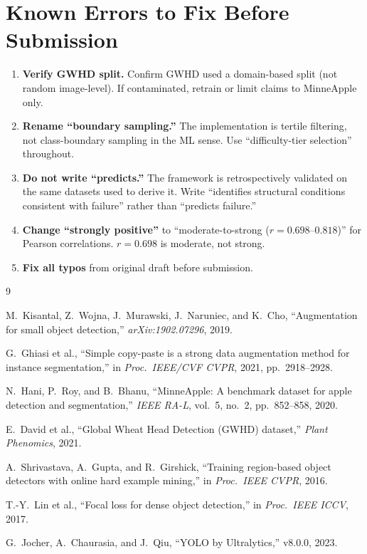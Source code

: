 \documentclass[10pt, a4paper]{article}
\begin{document}
\section{Known Errors to Fix Before Submission}

\begin{enumerate}[nosep, leftmargin=*]
\item \textbf{Verify GWHD split.}
  Confirm GWHD used a domain-based split (not random image-level).
  If contaminated, retrain or limit claims to MinneApple only.
\item \textbf{Rename ``boundary sampling.''} 
  The implementation is tertile filtering, not class-boundary sampling
  in the ML sense. Use ``difficulty-tier selection'' throughout.
\item \textbf{Do not write ``predicts.''}
  The framework is retrospectively validated on the same datasets
  used to derive it.
  Write ``identifies structural conditions consistent with failure''
  rather than ``predicts failure.''
\item \textbf{Change ``strongly positive''} to ``moderate-to-strong
  ($r=0.698$--$0.818$)'' for Pearson correlations.
  $r=0.698$ is moderate, not strong.
\item \textbf{Fix all typos} from original draft before submission.
\end{enumerate}

\begin{thebibliography}{9}

M.~Kisantal, Z.~Wojna, J.~Murawski, J.~Naruniec, and K.~Cho,
``Augmentation for small object detection,''
\textit{arXiv:1902.07296}, 2019.

G.~Ghiasi et al.,
``Simple copy-paste is a strong data augmentation method for instance
segmentation,''
in \textit{Proc.\ IEEE/CVF CVPR}, 2021, pp.\ 2918--2928.

N.~Hani, P.~Roy, and B.~Bhanu,
``MinneApple: A benchmark dataset for apple detection and segmentation,''
\textit{IEEE RA-L}, vol.~5, no.~2, pp.\ 852--858, 2020.

E.~David et al.,
``Global Wheat Head Detection (GWHD) dataset,''
\textit{Plant Phenomics}, 2021.

A.~Shrivastava, A.~Gupta, and R.~Girshick,
``Training region-based object detectors with online hard example mining,''
in \textit{Proc.\ IEEE CVPR}, 2016.

T.-Y.~Lin et al.,
``Focal loss for dense object detection,''
in \textit{Proc.\ IEEE ICCV}, 2017.

G.~Jocher, A.~Chaurasia, and J.~Qiu,
``YOLO by Ultralytics,'' v8.0.0, 2023.

\end{thebibliography}
\end{document}
